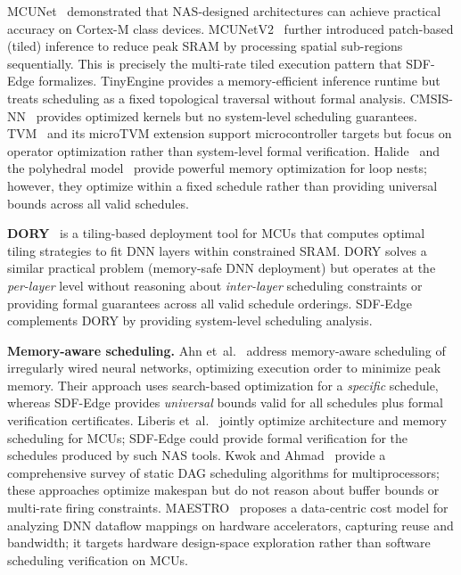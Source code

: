 \documentclass[journal]{IEEEtran}
\begin{document}
MCUNet~\cite{lin2020mcunet} demonstrated that NAS-designed architectures can achieve practical accuracy on Cortex-M class devices.
MCUNetV2~\cite{lin2021mcunetv2} further introduced patch-based (tiled) inference to reduce peak SRAM by processing spatial sub-regions sequentially. This is precisely the multi-rate tiled execution pattern that SDF-Edge formalizes.
TinyEngine provides a memory-efficient inference runtime but treats scheduling as a fixed topological traversal without formal analysis.
CMSIS-NN~\cite{lai2018cmsis} provides optimized kernels but no system-level scheduling guarantees.
TVM~\cite{chen2018tvm} and its microTVM extension support microcontroller targets but focus on operator optimization rather than system-level formal verification.
Halide~\cite{ragan2013halide} and the polyhedral model~\cite{verdoolaege2010isl} provide powerful memory optimization for loop nests; however, they optimize within a fixed schedule rather than providing universal bounds across all valid schedules.

\textbf{DORY}~\cite{burrello2021dory} is a tiling-based deployment tool for MCUs that computes optimal tiling strategies to fit DNN layers within constrained SRAM.
DORY solves a similar practical problem (memory-safe DNN deployment) but operates at the \emph{per-layer} level without reasoning about \emph{inter-layer} scheduling constraints or providing formal guarantees across all valid schedule orderings.
SDF-Edge complements DORY by providing system-level scheduling analysis.

\textbf{Memory-aware scheduling.}
Ahn et~al.~\cite{ahn2020ordering} address memory-aware scheduling of irregularly wired neural networks, optimizing execution order to minimize peak memory.
Their approach uses search-based optimization for a \emph{specific} schedule, whereas SDF-Edge provides \emph{universal} bounds valid for all schedules plus formal verification certificates.
Liberis et~al.~\cite{liberis2021munas} jointly optimize architecture and memory scheduling for MCUs; SDF-Edge could provide formal verification for the schedules produced by such NAS tools.
Kwok and Ahmad~\cite{kwok1999static} provide a comprehensive survey of static DAG scheduling algorithms for multiprocessors; these approaches optimize makespan but do not reason about buffer bounds or multi-rate firing constraints.
MAESTRO~\cite{kwon2019maestro} proposes a data-centric cost model for analyzing DNN dataflow mappings on hardware accelerators, capturing reuse and bandwidth; it targets hardware design-space exploration rather than software scheduling verification on MCUs.
\end{document}
